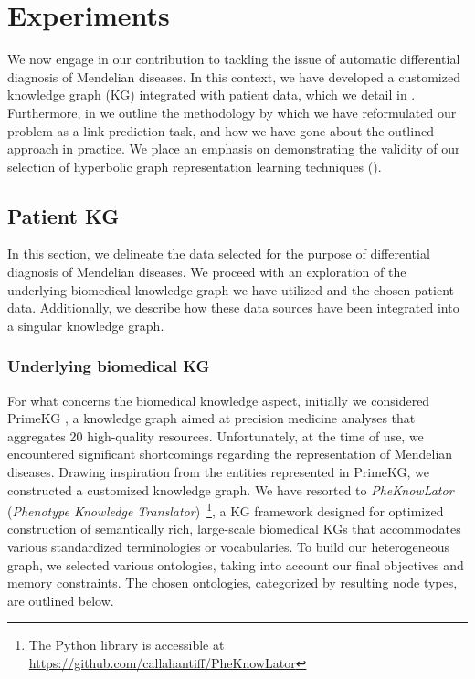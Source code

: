 \chapter{Experiments}
We now engage in our contribution to tackling the issue of automatic differential diagnosis of Mendelian diseases. In this context, we have developed a customized knowledge graph (KG) integrated with patient data, which we detail in . Furthermore, in  we outline the methodology by which we have reformulated our problem as a link prediction task, and how we have gone about the outlined approach in practice. We place an emphasis on demonstrating the validity of our selection of hyperbolic graph representation learning techniques ().

\section{Patient KG}\label{sec:patientKG}
In this section, we delineate the data selected for the purpose of differential diagnosis of Mendelian diseases. We proceed with an exploration of the underlying biomedical knowledge graph we have utilized and the chosen patient data. Additionally, we describe how these data sources have been integrated into a singular knowledge graph.

\subsection{Underlying biomedical KG}\label{sec:underlyingKG}
For what concerns the biomedical knowledge aspect, initially we considered PrimeKG \cite{chandak2023PrimeKG}, a knowledge graph aimed at precision medicine analyses that aggregates 20 high-quality resources. Unfortunately, at the time of use, we encountered significant shortcomings regarding the representation of Mendelian diseases. Drawing inspiration from the entities represented in PrimeKG, we constructed a customized knowledge graph. We have resorted to \emph{PheKnowLator} (\emph{Phenotype Knowledge Translator})~\cite{callahan2020PheKnowlator}\footnote{The Python library is accessible at \url{https://github.com/callahantiff/PheKnowLator}}, a KG framework designed for optimized construction of semantically rich, large-scale biomedical KGs that accommodates various standardized terminologies or vocabularies. To build our heterogeneous graph, we selected various ontologies, taking into account our final objectives and memory constraints. The chosen ontologies, categorized by resulting node types, are outlined below.


